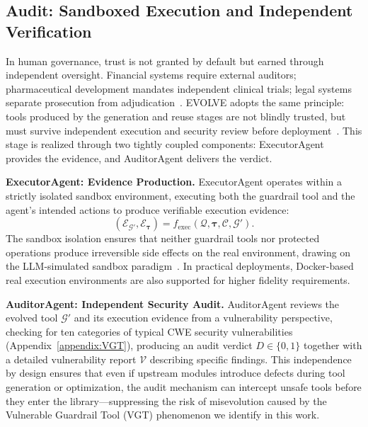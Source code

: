   \subsection{Audit: Sandboxed Execution and Independent Verification}

  In human governance, trust is not granted by default but earned through independent oversight. Financial systems require external auditors; pharmaceutical development mandates independent clinical trials; legal systems
   separate prosecution from adjudication~\citep{taleb2012things}. EVOLVE adopts the same principle: tools produced by the generation and reuse stages are not blindly trusted, but must survive independent execution and
  security review before deployment~\citep{han2025alignment,shao2025misevovle}. This stage is realized through two tightly coupled components: ExecutorAgent provides the evidence, and AuditorAgent delivers the verdict.

  \noindent\textbf{ExecutorAgent: Evidence Production.} ExecutorAgent operates within a strictly isolated sandbox environment, executing both the guardrail tool and the agent's intended actions to produce verifiable
  execution evidence:
  \begin{equation}
      (\mathcal{E}_{\mathcal{G}'}, \mathcal{E}_{\boldsymbol{\tau}}) = f_{\mathrm{exec}}\left( \mathcal{Q}, \boldsymbol{\tau}, \mathcal{C}, \mathcal{G}' \right).
  \end{equation}
  The sandbox isolation ensures that neither guardrail tools nor protected operations produce irreversible side effects on the real environment, drawing on the LLM-simulated sandbox paradigm~\citep{ruan2023identifying}.
  In practical deployments, Docker-based real execution environments are also supported for higher fidelity requirements.

  \noindent\textbf{AuditorAgent: Independent Security Audit.} AuditorAgent reviews the evolved tool $\mathcal{G}'$ and its execution evidence from a vulnerability perspective, checking for ten categories of typical CWE
  security vulnerabilities (Appendix~\ref{appendix:VGT}), producing an audit verdict $D \in \{0, 1\}$ together with a detailed vulnerability report $\mathcal{V}$ describing specific findings. This independence by design ensures that even if upstream modules introduce defects during tool generation
   or optimization, the audit mechanism can intercept unsafe tools before they enter the library---suppressing the risk of misevolution caused by the Vulnerable Guardrail Tool (VGT) phenomenon we identify in this work.

